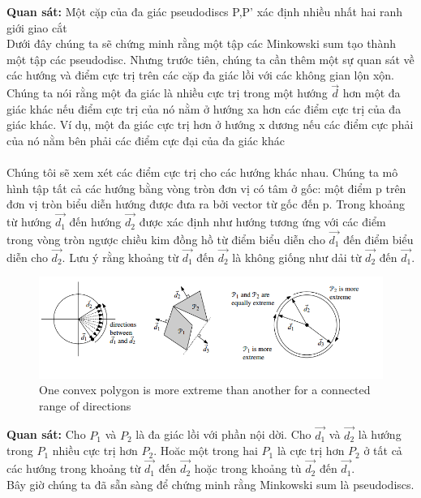 \documentclass[a4paper,12pt]{report}
\begin{document}
\textbf{Quan sát: }Một cặp của đa giác pseudodiscs P,P' xác định nhiều nhất hai ranh giới giao cắt  \\
Dưới đây chúng ta sẽ chứng minh rằng một  tập các  Minkowski sum tạo thành một tập các pseudodisc. Nhưng trước tiên, chúng ta cần thêm một sự quan sát về các hướng và điểm cực trị trên các cặp đa giác lồi với các không gian lộn xộn. Chúng ta nói rằng một đa giác là nhiều cực trị  trong một hướng $\overrightarrow{d}$ hơn một đa giác khác nếu điểm cực trị của nó nằm ở hướng xa hơn các điểm cực trị của đa giác khác. Ví dụ, một đa giác cực trị hơn ở hướng x dương nếu các điểm cực phải của nó nằm bên phải các điểm cực đại của đa giác khác \\ \\
Chúng tôi sẽ xem xét các điểm cực trị cho các hướng khác nhau. Chúng ta mô hình tập tất cả các hướng bằng vòng tròn đơn vị có tâm ở gốc: một điểm p trên đơn vị tròn biểu diễn hướng được đưa ra bởi vector từ gốc đến p. Trong khoảng từ hướng $\overrightarrow{d_1}$ đến hướng $\overrightarrow{d_2}$ được xác định như hướng tương ứng với các điểm trong vòng tròn ngược chiều kim đồng hồ từ điểm biểu diễn cho $\overrightarrow{d_1}$ đến điểm biểu diễn cho $\overrightarrow{d_2}$. Lưu ý rằng khoảng từ $\overrightarrow{d_1}$ đến $\overrightarrow{d_2}$ là không giống như dải từ $\overrightarrow{d_2}$ đến $\overrightarrow{d_1}$. 
\begin{figure}[H]
\centering
\includegraphics[width=0.9\linewidth]{7.png}
\caption{One convex polygon is more extreme than another for a connected range of directions}
\end{figure}
\textbf{Quan sát: } Cho $P_1$ và $P_2$ là đa giác lồi với phần nội dời. Cho $\overrightarrow{d_1}$ và $\overrightarrow{d_2}$ là hướng trong $P_1$ nhiều cực trị hơn $P_2$. Hoăc một trong hai $P_1$ là cực trị hơn $P_2$ ở tất cả các hướng trong khoảng từ $\overrightarrow{d_1}$ đến $\overrightarrow{d_2}$ hoặc trong khoảng tù $\overrightarrow{d_2}$ đến $\overrightarrow{d_1}$. \\ 
Bây giờ chúng ta đã sẵn sàng để chứng minh rằng Minkowski sum là pseudodiscs.\\ \\
\end{document}
